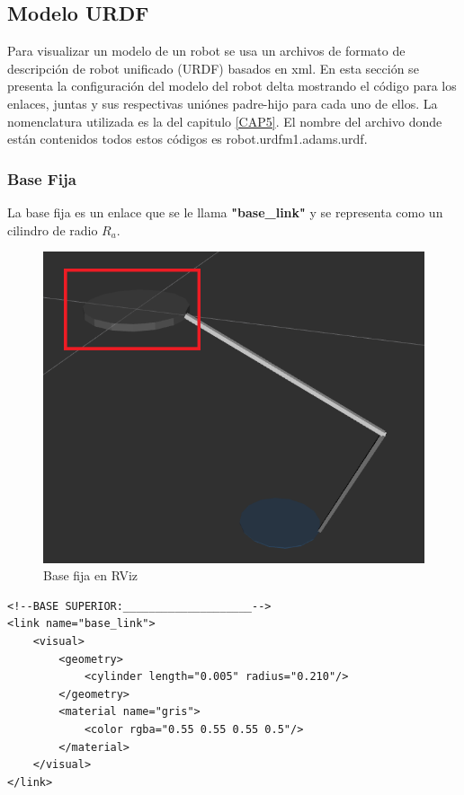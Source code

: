     \newpage
       
       
       
    \subsection{Modelo URDF}
        Para visualizar un modelo de un robot se usa un archivos de formato de descripción de robot unificado (URDF) basados en xml. En esta sección se presenta la configuración del modelo del robot delta mostrando el código para los enlaces, juntas y sus respectivas uniónes padre-hijo para cada uno de ellos. La nomenclatura utilizada es la del capitulo \eqref{CAP5}. El nombre del archivo donde están contenidos todos estos códigos es robot.urdfm1.adams.urdf.  
        
       \subsubsection{Base Fija}
        La base fija es un enlace que se le llama \textbf{"base\_link"} y se representa como un cilindro de radio \textbf{$R_a$}.

             \begin{figure}[h]
                \centering
                \includegraphics[width=0.55\linewidth]{Main/Chapter6/Images6/cap6_basefija.png}
                \caption{Base fija en RViz}
                \label{f:Cap6_urdf_1}
            \end{figure}  


        \lstset{language=XML}
        \begin{lstlisting}
<!--BASE SUPERIOR:____________________-->
<link name="base_link">
	<visual>
		<geometry>
			<cylinder length="0.005" radius="0.210"/> 
		</geometry>
		<material name="gris">
			<color rgba="0.55 0.55 0.55 0.5"/>
		</material>
	</visual>
</link>
        \end{lstlisting}

